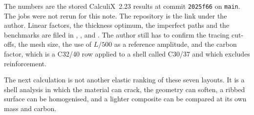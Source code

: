 \documentclass[11pt,a4paper]{article}
\begin{document}
The numbers are the stored CalculiX~2.23 results at commit \texttt{2025f66} on \texttt{main}.
The jobs were not rerun for this note.
The repository is the link under the \mbox{author}.
Linear factors, the thickness optimum, the imperfect paths and the benchmarks are filed in , ,  and .
The author still has to confirm the tracing cut-offs, the mesh size, the use of \(L/500\) as a reference amplitude, and the carbon factor, which is a C32/40 row applied to a shell called C30/37 and which excludes reinforcement.

The next calculation is not another elastic ranking of these seven layouts.
It is a shell analysis in which the material can crack, the geometry can soften, a ribbed surface can be homogenised, and a lighter composite can be compared at its own mass and carbon.

\setlength{\bibsep}{2pt plus 1pt}


\end{document}
